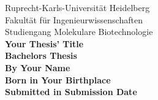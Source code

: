 \begin{titlepage}
    \begin{center}
        \large{Ruprecht-Karls-Universität Heidelberg}\\[-0.5em]
        \large{Fakultät für Ingenieurwissenschaften}\\[-0.5em]
        \large{Studiengang Molekulare Biotechnologie}\\[6em]

        \textbf{\Large Your Thesis' Title}\\[12em]

        \textbf{\Large Bachelors Thesis}\\[8em]

        \textbf{By Your Name}\\[-0.5em]
        \textbf{Born in Your Birthplace}\\[0.5em]

        \textbf{Submitted in Submission Date}\\[4em]
    \end{center}
    \thispagestyle{empty}
\end{titlepage}
\clearpage

\thispagestyle{empty}
\null
\clearpage